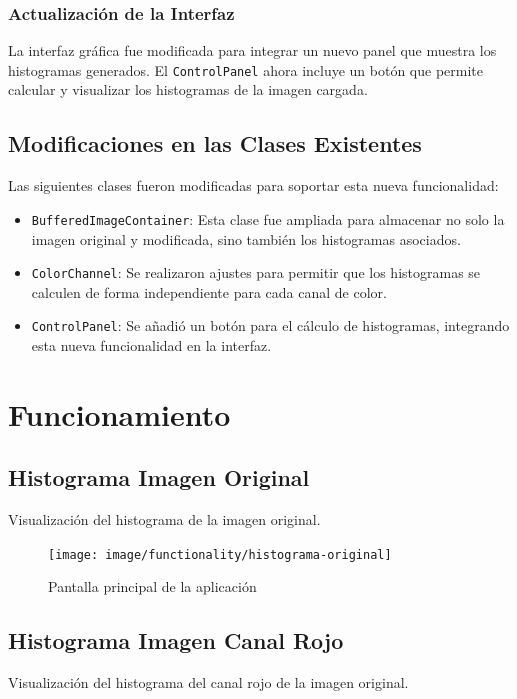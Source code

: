 \documentclass{report}
\begin{document}
  \subsection{Actualización de la Interfaz}\label{subsec:actualizacion-de-la-interfaz}
  La interfaz gráfica fue modificada para integrar un nuevo panel que muestra los histogramas generados.
  El \texttt{ControlPanel} ahora incluye un botón que permite calcular y visualizar los histogramas de la imagen cargada.


  \section{Modificaciones en las Clases Existentes}\label{sec:modificaciones-en-las-clases-existentes}
  Las siguientes clases fueron modificadas para soportar esta nueva funcionalidad:
  \begin{itemize}
    \item \texttt{BufferedImageContainer}: Esta clase fue ampliada para almacenar no solo la imagen original y modificada, sino también los histogramas asociados.
    \item \texttt{ColorChannel}: Se realizaron ajustes para permitir que los histogramas se calculen de forma independiente para cada canal de color.
    \item \texttt{ControlPanel}: Se añadió un botón para el cálculo de histogramas, integrando esta nueva funcionalidad en la interfaz.
  \end{itemize}


  \chapter{Funcionamiento}\label{ch:funcionamiento}


  \section{Histograma Imagen Original}\label{sec:histograma-imagen-original}
  Visualización del histograma de la imagen original.

  \begin{figure}[H]
    \centering
    \texttt{[image: image/functionality/histograma-original]}
    \caption{Pantalla principal de la aplicación}\label{fig:histograma-original}
  \end{figure}

  \section{Histograma Imagen Canal Rojo}\label{sec:histograma-imagen-canal-rojo}
  Visualización del histograma del canal rojo de la imagen original.
\end{document}
